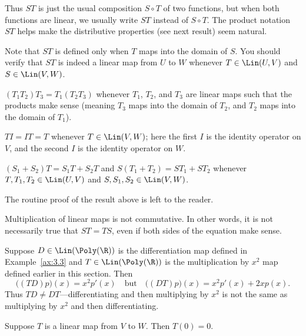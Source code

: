 Thus $ST$ is just the usual composition $S\circ T$ of two functions, but when
both functions are linear, we usually write $ST$ instead of $S\circ T$. The
product notation $ST$ helps make the distributive properties (see next result)
seem natural.

Note that $ST$ is defined only when $T$ maps into the domain of $S$. You should
verify that $ST$ is indeed a linear map from $U$ to $W$ whenever
$T\in\Lin(U,V)$ and $S\in\Lin(V,W)$.

\begin{result}\label{ax:3.8}\leavevmode
\begin{axprops}
\item[associativity] $(T_1T_2)T_3=T_1(T_2T_3)$ whenever $T_1$, $T_2$, and
  $T_3$ are linear maps such that the products make sense (meaning $T_3$ maps
  into the domain of $T_2$, and $T_2$ maps into the domain of $T_1$).
\item[identity] $TI=IT=T$ whenever $T\in\Lin(V,W)$; here the first $I$ is the
  identity operator on $V$, and the second $I$ is the identity operator on
  $W$.
\item[distributive properties] $(S_1+S_2)T=S_1T+S_2T$ and
  $S(T_1+T_2)=ST_1+ST_2$ whenever $T,T_1,T_2\in\Lin(U,V)$ and
  $S,S_1,S_2\in\Lin(V,W)$.
\end{axprops}
\end{result}

The routine proof of the result above is left to the reader.

Multiplication of linear maps is not commutative. In other words, it is not
necessarily true that $ST=TS$, even if both sides of the equation make sense.

\begin{example}\label{ax:3.9}
Suppose $D\in\Lin(\Poly(\R))$ is the differentiation map defined in
Example~\ref{ax:3.3} and $T\in\Lin(\Poly(\R))$ is the multiplication by $x^2$
map defined earlier in this section. Then
\[ \bigl((TD)p\bigr)(x)=x^2p'(x) \quad\text{but}\quad
   \bigl((DT)p\bigr)(x)=x^2p'(x)+2xp(x). \]
Thus $TD\ne DT$---differentiating and then multiplying by $x^2$ is not the
same as multiplying by $x^2$ and then differentiating.
\end{example}

\begin{result}\label{ax:3.10}
Suppose $T$ is a linear map from $V$ to $W$. Then $T(0)=0$.
\end{result}

